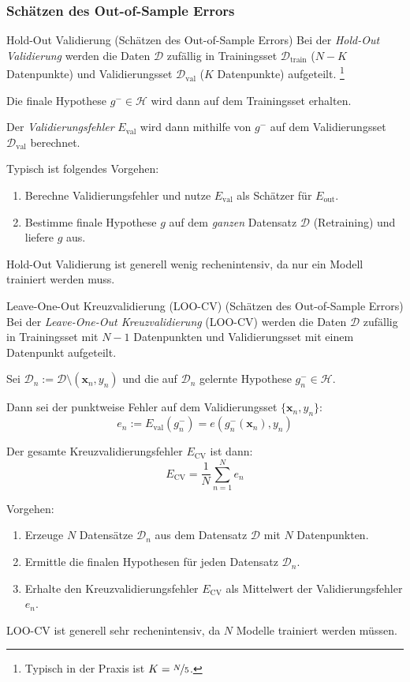 \subsubsection{Schätzen des Out-of-Sample Errors}

\begin{defi}{Hold-Out Validierung (Schätzen des Out-of-Sample Errors)}
    Bei der \emph{Hold-Out Validierung} werden die Daten $\mathcal{D}$ zufällig in Trainingsset $\mathcal{D}_\text{train}$ ($N-K$ Datenpunkte) und Validierungsset $\mathcal{D}_\text{val}$ ($K$ Datenpunkte) aufgeteilt.
    \footnote{Typisch in der Praxis ist $K = \nicefrac{N}{5}$.}

    Die finale Hypothese $g^{-} \in \mathcal{H}$ wird dann auf dem Trainingsset erhalten.

    Der \emph{Validierungsfehler} $E_\text{val}$ wird dann mithilfe von $g^{-}$ auf dem Validierungsset $\mathcal{D}_\text{val}$ berechnet.

    Typisch ist folgendes Vorgehen:
    \begin{enumerate}
        \item Berechne Validierungsfehler und nutze $E_\text{val}$ als Schätzer für $E_\text{out}$.
        \item Bestimme finale Hypothese $g$ auf dem \emph{ganzen} Datensatz $\mathcal{D}$ (Retraining) und liefere $g$ aus.
    \end{enumerate}

    Hold-Out Validierung ist generell wenig rechenintensiv, da nur ein Modell trainiert werden muss.
\end{defi}

\begin{defi}{Leave-One-Out Kreuzvalidierung (LOO-CV) (Schätzen des Out-of-Sample Errors)}
    Bei der \emph{Leave-One-Out Kreuzvalidierung} (LOO-CV) werden die Daten $\mathcal{D}$ zufällig in Trainingsset mit $N-1$ Datenpunkten und Validierungsset mit einem Datenpunkt aufgeteilt.

    Sei $\mathcal{D}_n := \mathcal{D} \setminus (\mathbf{x}_n, y_n)$ und die auf $\mathcal{D}_n$ gelernte Hypothese $g^{-}_n \in \mathcal{H}$.

    Dann sei der punktweise Fehler auf dem Validierungsset $\{ \mathbf{x}_n, y_n \}$:
    \[
        e_n := E_\text{val}(g^{-}_n) = e(g^{-}_n(\mathbf{x}_n), y_n)
    \]

    Der gesamte Kreuzvalidierungsfehler $E_\text{CV}$ ist dann:
    \[
        E_\text{CV} = \frac{1}{N} \sum_{n=1}^N e_n
    \]

    Vorgehen:
    \begin{enumerate}
        \item Erzeuge $N$ Datensätze $\mathcal{D}_n$ aus dem Datensatz $\mathcal{D}$ mit $N$ Datenpunkten.
        \item Ermittle die finalen Hypothesen für jeden Datensatz $\mathcal{D}_n$.
        \item Erhalte den Kreuzvalidierungsfehler $E_\text{CV}$ als Mittelwert der Validierungsfehler $e_n$.
    \end{enumerate}

    LOO-CV ist generell sehr rechenintensiv, da $N$ Modelle trainiert werden müssen.
\end{defi}

